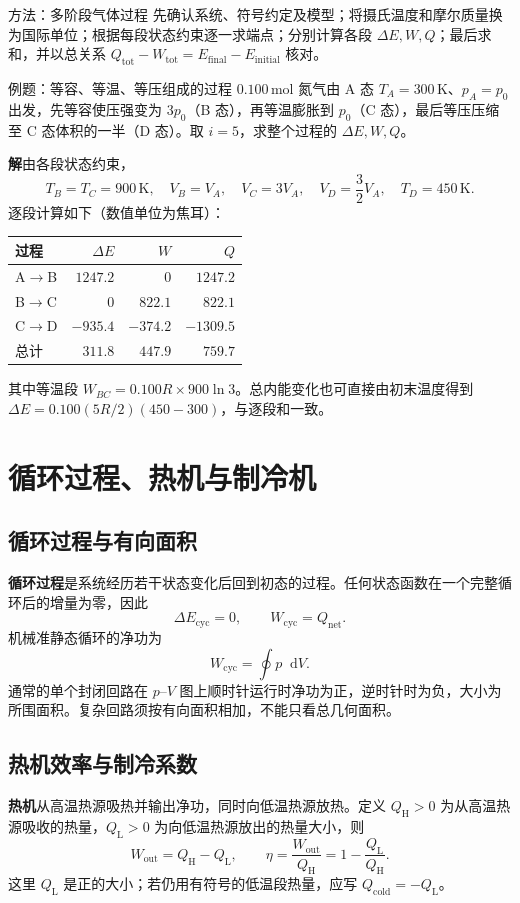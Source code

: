\documentclass[UTF8,fontset=none,zihao=-4,a4paper]{ctexart}
\newcommand{\chapterpage}[1]{\clearpage\section{#1}}
\newcommand{\term}[1]{\textbf{#1}}
\newcommand{\dd}{\mathop{}\!\mathrm{d}}
\newcommand{\unit}[1]{\,\mathrm{#1}}
\newcommand{\sol}{\par\noindent\textbf{解}\quad}
\begin{document}
\begin{infobox}{方法：多阶段气体过程}
先确认系统、符号约定及模型；将摄氏温度和摩尔质量换为国际单位；根据每段状态约束逐一求端点；分别计算各段 $\Delta E,W,Q$；最后求和，并以总关系 $Q_{\mathrm{tot}}-W_{\mathrm{tot}}=E_{\mathrm{final}}-E_{\mathrm{initial}}$ 核对。
\end{infobox}

\begin{infobox}{例题：等容、等温、等压组成的过程}
$0.100\unit{mol}$ 氮气由 A 态 $T_A=300\unit K$、$p_A=p_0$ 出发，先等容使压强变为 $3p_0$（B 态），再等温膨胀到 $p_0$（C 态），最后等压压缩至 C 态体积的一半（D 态）。取 $i=5$，求整个过程的 $\Delta E,W,Q$。
\end{infobox}
\sol 由各段状态约束，
\[
 T_B=T_C=900\unit K,\quad V_B=V_A,\quad
 V_C=3V_A,\quad V_D=\frac32V_A,\quad T_D=450\unit K.
\]
逐段计算如下（数值单位为焦耳）：
\begin{center}
\begin{tabular}{l r r r}
\toprule
过程 & $\Delta E$ & $W$ & $Q$\\
\midrule
A$\to$B & $1247.2$ & $0$ & $1247.2$\\
B$\to$C & $0$ & $822.1$ & $822.1$\\
C$\to$D & $-935.4$ & $-374.2$ & $-1309.5$\\
\midrule
总计 & $311.8$ & $447.9$ & $759.7$\\
\bottomrule
\end{tabular}
\end{center}
其中等温段 $W_{BC}=0.100R\times900\ln3$。总内能变化也可直接由初末温度得到 $\Delta E=0.100(5R/2)(450-300)$，与逐段和一致。

\chapterpage{循环过程、热机与制冷机}
\subsection{循环过程与有向面积}
\term{循环过程}是系统经历若干状态变化后回到初态的过程。任何状态函数在一个完整循环后的增量为零，因此
\[
 \Delta E_{\mathrm{cyc}}=0,\qquad W_{\mathrm{cyc}}=Q_{\mathrm{net}}.
\]
机械准静态循环的净功为
\[
 W_{\mathrm{cyc}}=\oint p\dd V.
\]
通常的单个封闭回路在 $p$--$V$ 图上顺时针运行时净功为正，逆时针时为负，大小为所围面积。复杂回路须按有向面积相加，不能只看总几何面积。

\subsection{热机效率与制冷系数}
\term{热机}从高温热源吸热并输出净功，同时向低温热源放热。定义 $Q_{\mathrm H}>0$ 为从高温热源吸收的热量，$Q_{\mathrm L}>0$ 为向低温热源放出的热量大小，则
\[
 W_{\mathrm{out}}=Q_{\mathrm H}-Q_{\mathrm L},\qquad
 \eta=\frac{W_{\mathrm{out}}}{Q_{\mathrm H}}
 =1-\frac{Q_{\mathrm L}}{Q_{\mathrm H}}.
\]
这里 $Q_{\mathrm L}$ 是正的大小；若仍用有符号的低温段热量，应写 $Q_{\mathrm{cold}}=-Q_{\mathrm L}$。
\end{document}
